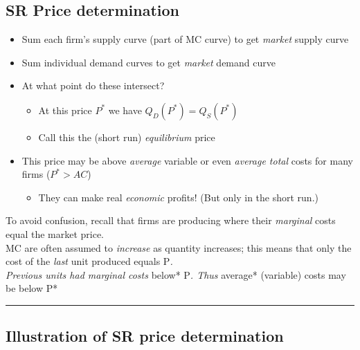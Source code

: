 \documentclass[]{article}
\providecommand{\tightlist}{%
  \setlength{\itemsep}{0pt}\setlength{\parskip}{0pt}}
\begin{document}
\hypertarget{sr-price-determination}{%
\subsection{SR Price determination}\label{sr-price-determination}}

\begin{itemize}
\tightlist
\item
  Sum each firm's supply curve (part of MC curve) to get \emph{market} supply curve
\item
  Sum individual demand curves to get \emph{market} demand curve
\item
  At what point do these intersect?

  \begin{itemize}
  \tightlist
  \item
    At this price \(P^*\) we have \(Q_D(P^*)=Q_S(P^*)\)
  \item
    Call this the (short run) \emph{equilibrium} price
  \end{itemize}
\end{itemize}

\bigskip

\begin{itemize}
\item
  This price may be above \emph{average} variable or even \emph{average total} costs for many firms (\(P^*>AC\))

  \begin{itemize}
  \tightlist
  \item
    They can make real \emph{economic} profits! (But only in the short run.)
  \end{itemize}
\end{itemize}

To avoid confusion, recall that firms are producing where their \emph{marginal} costs equal the market price.\\
MC are often assumed to \emph{increase} as quantity increases; this means that only the cost of the \emph{last} unit produced equals P\emph{.\\
Previous units had marginal costs }below* P\emph{. Thus }average* (variable) costs may be below P*

\begin{center}\rule{0.5\linewidth}{\linethickness}\end{center}

\hypertarget{illustration-of-sr-price-determination}{%
\subsection{Illustration of SR price determination}\label{illustration-of-sr-price-determination}}
\end{document}
